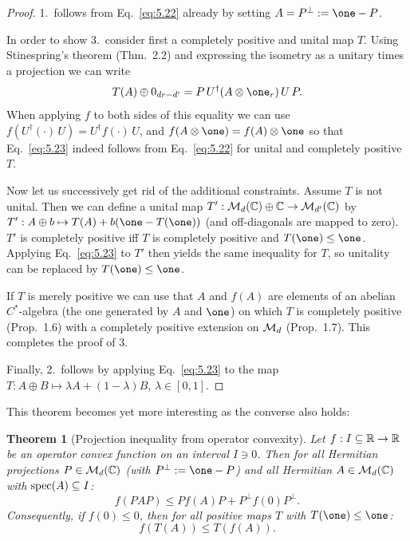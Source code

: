 \documentclass[11pt,a4paper]{article}
\theoremstyle{plain}
\newtheorem{theorem}{Theorem}[section]
\theoremstyle{definition}
\theoremstyle{remark}
\numberwithin{equation}{section}
\begin{document}
\begin{proof}
    1.\ follows from Eq.~\eqref{eq:5.22} already by setting $A=P^\perp := \one-P$.

    In order to show 3.\ consider first a completely positive and unital map $T$. Using
    Stinespring's theorem (Thm.~2.2) and expressing the isometry as a unitary times a
    projection we can write
    \begin{equation}\label{eq:5.24}
        T(A) \oplus 0_{dr-d'} = P\,U^\dagger (A\otimes \one_r)\,U\,P.
    \end{equation}
    When applying $f$ to both sides of this equality we can use
    $f(U^\dagger (\cdot)\,U)=U^\dagger f(\cdot)\,U$, and $f(A\otimes \one)=f(A)\otimes \one$
    so that Eq.~\eqref{eq:5.23} indeed follows from Eq.~\eqref{eq:5.22} for unital and
    completely positive $T$.

    Now let us successively get rid of the additional constraints. Assume $T$ is not
    unital. Then we can define a unital map
    $T':\mathcal{M}_d(\mathbb{C})\oplus \mathbb{C} \to \mathcal{M}_{d'}(\mathbb{C})$ by
    $T':A\oplus b \mapsto T(A)+b(\one-T(\one))$ (and off-diagonals are mapped to zero).
    $T'$ is completely positive iff $T$ is completely positive and $T(\one)\le \one$.
    Applying Eq.~\eqref{eq:5.23} to $T'$ then yields the same inequality for $T$, so
    unitality can be replaced by $T(\one)\le \one$.

    If $T$ is merely positive we can use that $A$ and $f(A)$ are elements of an abelian
    $C^*$-algebra (the one generated by $A$ and $\one$) on which $T$ is completely
    positive (Prop.~1.6) with a completely positive extension on $\mathcal{M}_d$ (Prop.~1.7).
    This completes the proof of 3.

    Finally, 2.\ follows by applying Eq.~\eqref{eq:5.23} to the map
    $T:A\oplus B \mapsto \lambda A+(1-\lambda)B$, $\lambda\in [0,1]$.
\end{proof}

This theorem becomes yet more interesting as the converse also holds:

\begin{theorem}[Projection inequality from operator convexity]
    Let $f:I\subseteq \mathbb{R} \to \mathbb{R}$ be an operator convex function on an interval $I\ni 0$.
    Then for all Hermitian projections $P\in \mathcal{M}_d(\mathbb{C})$ (with $P^\perp:=\one-P$) and all
    Hermitian $A\in \mathcal{M}_d(\mathbb{C})$ with $\operatorname{spec}(A)\subseteq I$:
    \begin{equation}\label{eq:5.25}
        f(PAP) \le P f(A)P + P^\perp f(0) P^\perp.
    \end{equation}
    Consequently, if $f(0)\le 0$, then for all positive maps $T$ with $T(\one)\le \one$:
    \begin{equation}\label{eq:5.26}
        f(T(A)) \le T(f(A)).
    \end{equation}
\end{theorem}
\end{document}
